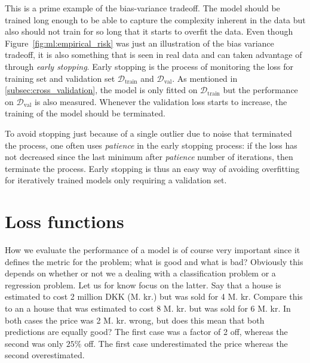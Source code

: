 \documentclass[a4paper, twoside, nobib]{tufte-book}
\begin{document}
This is a prime example of the bias-variance tradeoff. The model should be trained long enough to be able to capture the complexity inherent in the data but also should not train for so long that it starts to overfit the data. Even though Figure~\ref{fig:ml:empirical_risk} was just an illustration of the bias variance tradeoff, it is also something that is seen in real data and can taken advantage of through \emph{early stopping}. Early stopping is the process of monitoring the loss for training set and validation set $\mathcal{D}_\mathrm{train}$ and $\mathcal{D}_\mathrm{val}$. As mentioned in \autoref{subsec:cross_validation}, the model is only fitted on $\mathcal{D}_\mathrm{train}$ but the performance on $\mathcal{D}_\mathrm{val}$ is also measured. Whenever the validation loss starts to increase, the training of the model should be terminated. 

To avoid stopping just because of a single outlier due to noise that terminated the process, one often uses \emph{patience} in the early stopping process: if the loss has not decreased since the last minimum after \emph{patience} number of iterations, then terminate the process. Early stopping is thus an easy way of avoiding overfitting for iteratively trained models only requiring a validation set.  

\section{Loss functions}
\label{sec:loss_function}
How we evaluate the performance of a model is of course very important since it defines the metric for the problem; what is good and what is bad? Obviously this depends on whether or not we a dealing with a classification problem or a regression problem. Let us for know focus on the latter. Say that a house is estimated to cost 2 million DKK (M. kr.) but was sold for 4 M. kr. Compare this to an a house that was estimated to cost 8 M. kr. but was sold for 6 M. kr. In both cases the price was 2 M. kr. wrong, but does this mean that both predictions are equally good? The first case was a factor of 2 off, whereas the second was only $25\%$ off. The first case underestimated the price whereas the second overestimated. 
\end{document}
